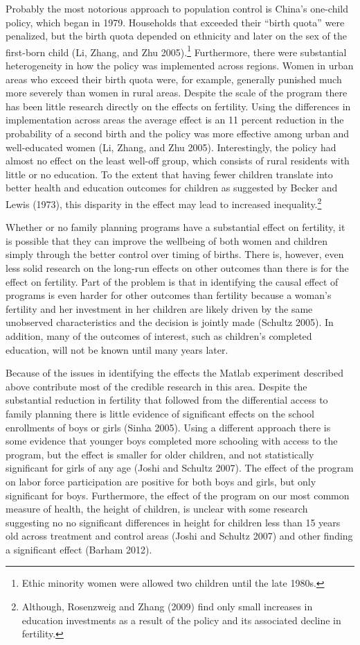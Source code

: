 \documentclass[]{article}
\begin{document}
Probably the most notorious approach to population control is China's one-child policy, which began in 1979. Households that exceeded their ``birth quota'' were penalized, but the birth quota depended on ethnicity and later on the sex of the first-born child (Li, Zhang, and Zhu 2005).\footnote{Ethic minority women were allowed two children until the late 1980s.} Furthermore, there were substantial heterogeneity in how the policy was implemented across regions. Women in urban areas who exceed their birth quota were, for example, generally punished much more severely than women in rural areas. Despite the scale of the program there has been little research directly on the effects on fertility. Using the differences in implementation across areas the average effect is an 11 percent reduction in the probability of a second birth and the policy was more effective among urban and well-educated women (Li, Zhang, and Zhu 2005). Interestingly, the policy had almost no eﬀect on the least well-oﬀ group, which consists of rural residents with little or no education. To the extent that having fewer children translate into better health and education outcomes for children as suggested by Becker and Lewis (1973), this disparity in the effect may lead to increased inequality.\footnote{Although, Rosenzweig and Zhang (2009) find only small increases in education investments as a result of the policy and its associated decline in fertility.}

Whether or no family planning programs have a substantial effect on fertility, it is possible that they can improve the wellbeing of both women and children simply through the better control over timing of births. There is, however, even less solid research on the long-run effects on other outcomes than there is for the effect on fertility. Part of the problem is that in identifying the causal effect of programs is even harder for other outcomes than fertility because a woman's fertility and her investment in her children are likely driven by the same unobserved characteristics and the decision is jointly made (Schultz 2005). In addition, many of the outcomes of interest, such as children's completed education, will not be known until many years later.

Because of the issues in identifying the effects the Matlab experiment described above contribute most of the credible research in this area. Despite the substantial reduction in fertility that followed from the differential access to family planning there is little evidence of significant effects on the school enrollments of boys or girls (Sinha 2005). Using a different approach there is some evidence that younger boys completed more schooling with access to the program, but the effect is smaller for older children, and not statistically significant for girls of any age (Joshi and Schultz 2007). The effect of the program on labor force participation are positive for both boys and girls, but only signiﬁcant for boys. Furthermore, the effect of the program on our most common measure of health, the height of children, is unclear with some research suggesting no no significant differences in height for children less than 15 years old across treatment and control areas (Joshi and Schultz 2007) and other finding a significant effect (Barham 2012).
\end{document}
